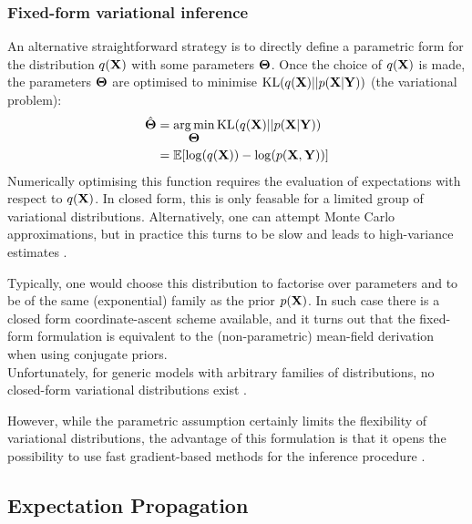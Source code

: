 \subsubsection{Fixed-form variational inference}  \label{section:fixed_form}

An alternative straightforward strategy is to directly define a parametric form for the distribution $q({\bf X})$ with some parameters $\mbox{\boldmath $\Theta$}$. Once the choice of $q({\bf X})$ is made, the parameters $\mbox{\boldmath $\Theta$}$ are optimised to minimise ${\rm KL}(q({\bf X})||p({\bf X}|{\bf Y}))$ (the variational problem):
\begin{align}
	\hat{\mbox{\boldmath $\Theta$}} &= \operatorname*{arg\,min}_{\mbox{\boldmath $\Theta$}} {\rm KL}(q({\bf X})||p({\bf X}|{\bf Y})) \\
	&= \mathbb{E}[\log(q({\bf X})) - \log(p({\bf X},{\bf Y}))]
\end{align}
Numerically optimising this function requires the evaluation of expectations with respect to $q({\bf X})$. In closed form, this is only feasable for a limited group of variational distributions. Alternatively, one can attempt Monte Carlo approximations, but in practice this turns to be slow and leads to high-variance estimates \cite{Braun2007,Ranganath2014,Braun2007}.

Typically, one would choose this distribution to factorise over parameters and to be of the same (exponential) family as the prior $p({\bf X})$. In such case there is a closed form coordinate-ascent scheme available, and it turns out that the fixed-form formulation is equivalent to the (non-parametric) mean-field derivation when using conjugate priors.\\
Unfortunately, for generic models with arbitrary families of distributions, no closed-form variational distributions exist \cite{Zhang2017,Blei2016}. 

However, while the parametric assumption certainly limits the flexibility of variational distributions, the advantage of this formulation is that it opens the possibility to use fast gradient-based methods for the inference procedure \cite{Hoffman2012,Ranganath2014}.


\subsection{Expectation Propagation}  \label{section:expectation_propagation}

